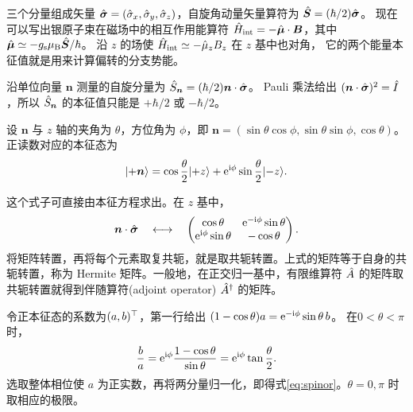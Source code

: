 三个分量组成矢量 $\hat{\bm{\sigma}} = (\hat{\sigma}_x,\hat{\sigma}_y,\hat{\sigma}_z)$，自旋角动量矢量算符为 $\hat{\bm{S}} = (\hbar/2)\hat{\bm{\sigma}}$。
现在可以写出银原子束在磁场中的相互作用能算符 $\hat{H}_{\mathrm{int}} = -\hat{\bm{\mu}} \cdot \bm B$，其中 $\hat{\bm{\mu}} \simeq -g_{\mathrm{s}}\mu_{\mathrm{B}}\hat{\bm{S}}/\hbar$。
沿 $z$ 的场使 $\hat{H}_{\mathrm{int}} \simeq -\hat{\mu}_z B_z$ 在 $z$ 基中也对角，
它的两个能量本征值就是用来计算偏转的分支势能。

沿单位向量 $\bm n$ 测量的自旋分量为 $\hat{S}_{\bm n} = (\hbar/2)\bm n \cdot \hat{\bm{\sigma}}$。
Pauli 乘法给出 $(\bm n \cdot \hat{\bm{\sigma}})^2 = \hat{I}$，所以 $\hat{S}_{\bm n}$ 的本征值只能是 $+\hbar/2$ 或 $-\hbar/2$。

设 $\bm n$ 与 $z$ 轴的夹角为 $\theta$，方位角为 $\phi$，即 $\bm n = (\sin\theta\cos\phi,\sin\theta\sin\phi,\cos\theta)$。正读数对应的本征态为
\begin{equation}
    \lvert+\bm n\rangle = \cos\frac\theta2\lvert+z\rangle
    + \mathop{}\!\mathrm{e}^{\mathrm{i}\phi}\sin\frac\theta2\lvert-z\rangle.
    \label{eq:spinor}
\end{equation}

这个式子可直接由本征方程求出。在 $z$ 基中，
\begin{equation}
    \bm n \cdot \hat{\bm{\sigma}} \quad\longleftrightarrow\quad
    \begin{pmatrix}
        \cos\theta&\mathop{}\!\mathrm{e}^{-\mathrm{i}\phi}\sin\theta\\
        \mathop{}\!\mathrm{e}^{\mathrm{i}\phi}\sin\theta&-\cos\theta
    \end{pmatrix}.
\end{equation}
将矩阵转置，再将每个元素取复共轭，就是取共轭转置。上式的矩阵等于自身的共轭转置，称为 Hermite 矩阵。一般地，在正交归一基中，有限维算符 $\hat{A}$ 的矩阵取共轭转置就得到伴随算符(adjoint operator) $\hat{A}^\dagger$ 的矩阵。

令正本征态的系数为$(a,b)^\top$，第一行给出
$(1 - \cos\theta)a = \mathop{}\!\mathrm{e}^{-\mathrm{i}\phi}\sin\theta\,b$。
在$0 < \theta < \pi$时，
\begin{equation}
    \frac ba = \mathop{}\!\mathrm{e}^{\mathrm{i}\phi}\frac{1 - \cos\theta}{\sin\theta}
    = \mathop{}\!\mathrm{e}^{\mathrm{i}\phi}\tan\frac\theta2.
\end{equation}
选取整体相位使 $a$ 为正实数，再将两分量归一化，即得式\eqref{eq:spinor}。$\theta = 0,\pi$ 时取相应的极限。

